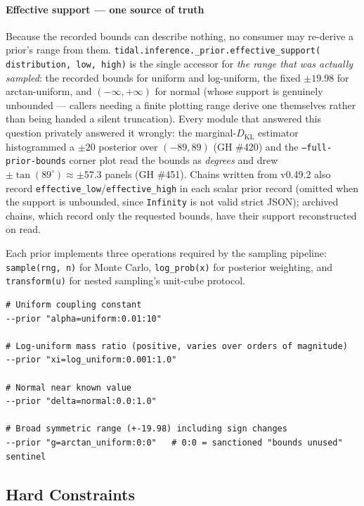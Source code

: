 \paragraph{Effective support --- one source of truth}
Because the recorded bounds can describe nothing, no consumer may re-derive
a prior's range from them.  \texttt{tidal.inference.\_prior.effective\_support(%
distribution, low, high)} is the single accessor for \emph{the range that was
actually sampled}: the recorded bounds for uniform and log-uniform, the fixed
$\pm 19.98$ for arctan-uniform, and $(-\infty, +\infty)$ for normal (whose
support is genuinely unbounded --- callers needing a finite plotting range
derive one themselves rather than being handed a silent truncation).  Every
module that answered this question privately answered it wrongly: the
marginal-$D_\mathrm{KL}$ estimator histogrammed a $\pm 20$ posterior over
$(-89, 89)$ (GH \#420) and the \texttt{--full-prior-bounds} corner plot read
the bounds as \emph{degrees} and drew $\pm\tan(89^\circ) \approx \pm 57.3$
panels (GH \#451).  Chains written from v0.49.2 also record
\texttt{effective\_low}/\texttt{effective\_high} in each scalar prior record
(omitted when the support is unbounded, since \texttt{Infinity} is not valid
strict JSON); archived chains, which record only the requested bounds, have
their support reconstructed on read.

Each prior implements three operations required by the sampling pipeline:
\texttt{sample(rng, n)} for Monte Carlo, \texttt{log\_prob(x)} for posterior
weighting, and \texttt{transform(u)} for nested sampling's unit-cube protocol.

\begin{lstlisting}[style=bash]
# Uniform coupling constant
--prior "alpha=uniform:0.01:10"

# Log-uniform mass ratio (positive, varies over orders of magnitude)
--prior "xi=log_uniform:0.001:1.0"

# Normal near known value
--prior "delta=normal:0.0:1.0"

# Broad symmetric range (+-19.98) including sign changes
--prior "g=arctan_uniform:0:0"   # 0:0 = sanctioned "bounds unused" sentinel
\end{lstlisting}

\subsection{Hard Constraints}
\label{sec:inference-constraints}

